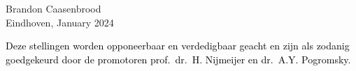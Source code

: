 \documentclass[a5paper]{article}
\begin{document}
\vfill
\begin{flushright}
Brandon Caasenbrood \\[0.15em]
Eindhoven, January 2024
\end{flushright} 

\begin{center}
\textcolor{black}{
\scriptsize Deze stellingen worden opponeerbaar en verdedigbaar geacht en zijn als zodanig goedgekeurd door de promotoren prof.\ dr.\ H. Nijmeijer en dr.\ A.Y. Pogromsky.}
\end{center}

\end{document}
